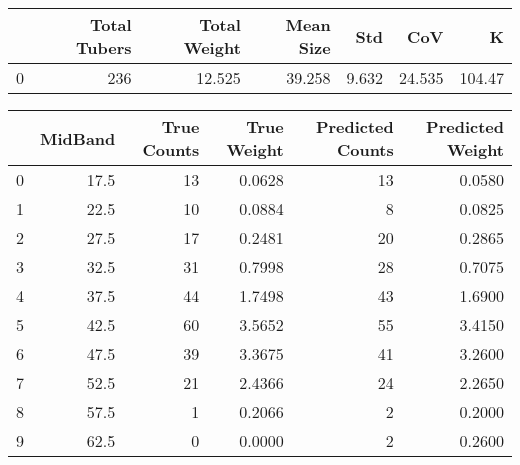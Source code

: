\begin{tabular}{lrrrrrr}
\toprule
{} &  Total Tubers &  Total Weight &  Mean Size &    Std &     CoV &       K \\
\midrule
0 &           236 &        12.525 &     39.258 &  9.632 &  24.535 &  104.47 \\
\bottomrule
\end{tabular}

\begin{tabular}{lrrrrr}
\toprule
{} &  MidBand &  True Counts &  True Weight &  Predicted Counts &  Predicted Weight \\
\midrule
0 &     17.5 &           13 &       0.0628 &                13 &            0.0580 \\
1 &     22.5 &           10 &       0.0884 &                 8 &            0.0825 \\
2 &     27.5 &           17 &       0.2481 &                20 &            0.2865 \\
3 &     32.5 &           31 &       0.7998 &                28 &            0.7075 \\
4 &     37.5 &           44 &       1.7498 &                43 &            1.6900 \\
5 &     42.5 &           60 &       3.5652 &                55 &            3.4150 \\
6 &     47.5 &           39 &       3.3675 &                41 &            3.2600 \\
7 &     52.5 &           21 &       2.4366 &                24 &            2.2650 \\
8 &     57.5 &            1 &       0.2066 &                 2 &            0.2000 \\
9 &     62.5 &            0 &       0.0000 &                 2 &            0.2600 \\
\bottomrule
\end{tabular}

